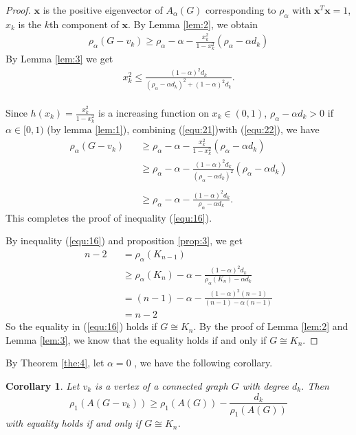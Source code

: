 \documentclass[amsthm]{elsart}
\newtheorem{corollary}{Corollary}[section]
\begin{document}
\begin{proof}
$\textbf{x}$ is the positive eigenvector of $A_\alpha (G)$ corresponding to $\rho _\alpha$  with $\textbf{x}^T \textbf{x} = 1$, $x_k$ is the $k$th component of $\textbf{x}$.
By Lemma \ref {lem:2}, we obtain \\
\begin{eqnarray} \label{equ:21}
\rho _\alpha (G - v_k)
    \geqslant \rho _\alpha - \alpha - \frac{x_k^2}{1 - x_k^2} (\rho _\alpha - \alpha d_k)
\end{eqnarray}
By Lemma \ref {lem:3} we get
\begin{eqnarray} \label{equ:22}
x_k^2 \leqslant \frac{(1 - \alpha)^2 d_k}{(\rho _\alpha - \alpha d_k)^2 + (1 - \alpha)^2 d_k}.
\end{eqnarray}
\\
Since $h(x_k) = \frac{x_k^2}{1 - x_k^2} $ is a increasing function on $x_k \in (0, 1)$, $\rho _\alpha - \alpha d_k > 0$ if $\alpha \in [0, 1)$ (by lemma \ref{lem:1}), combining (\ref{equ:21})with (\ref{equ:22}), we have  \\
\begin{eqnarray*}
\rho _\alpha (G - v_k)
  &&\geqslant \rho _\alpha - \alpha - \frac{x_k^2}{1 - x_k^2} (\rho _\alpha - \alpha d_k)
  \\ &&\geqslant \rho _\alpha - \alpha - \frac{(1 - \alpha)^2 d_k}{(\rho _\alpha - \alpha d_k)^2} (\rho _\alpha - \alpha d_k)  \\
  \\ &&\geqslant \rho _\alpha - \alpha - \frac{(1 - \alpha)^2 d_k}{\rho _\alpha - \alpha d_k}
.
\end{eqnarray*}
This completes the proof of inequality (\ref{equ:16}).

 By inequality (\ref{equ:16}) and proposition \ref{prop:3}, we get
\begin{eqnarray*}
n - 2 &&= \rho_\alpha(K_{n - 1})
\\ &&\geqslant \rho _\alpha(K_n) - \alpha - \frac{(1 - \alpha)^2 d_k}{\rho _\alpha(K_n) - \alpha d_k}
\\ &&= (n-1) - \alpha - \frac{(1 - \alpha)^2 (n-1)}{(n-1) - \alpha (n-1)}
\\ &&= n - 2
\end{eqnarray*}
So the equality in (\ref{equ:16})  holds if $G \cong K_n$.
By the proof of Lemma \ref {lem:2} and Lemma \ref {lem:3}, we know that the equality holds if and only if $G \cong K_n$.
\end{proof}

By Theorem \ref{the:4}, let $\alpha = 0$ , we have the following corollary.
\begin{corollary} \label{coro:4}
Let $v_k$ is a vertex of a connected graph $G$ with degree $d_k$.  Then
\begin{equation} \label{equ:coro4}
\rho _1 (A(G - v_k))
  \geqslant \rho _1(A(G)) - \frac{d_k}{\rho _1(A(G))}
\end{equation}
with equality holds if and only if $G \cong K_n$.
\end{corollary}
\end{document}
